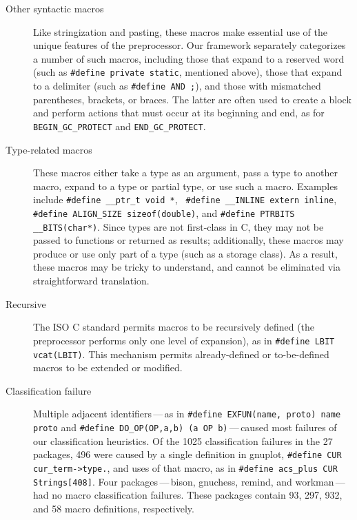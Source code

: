 \documentclass[11pt]{article}
\def\numpackages{27}
\begin{document}
\begin{description}
\item[Other syntactic macros]  Like stringization and pasting, these
  macros make essential use of the unique features of the preprocessor.
  Our framework separately categorizes a number of such macros, including
  those that expand to a reserved word (such as {\tt \#define private
  static}, mentioned above), those that expand to a delimiter (such as
{\tt \#define AND ;}), and those with mismatched parentheses, brackets, or
braces.  The latter are often used to create a block and perform actions
that must occur at its beginning and end, as for \verb|BEGIN_GC_PROTECT|
and \verb|END_GC_PROTECT|.

\item[Type-related macros]  These macros either take a type as an argument, pass
  a type to another macro, expand to a type or partial type, or use such a
  macro.  Examples include {\tt \#define \verb|__ptr_t| void *}, {\tt
  \#define \verb|__INLINE| extern inline}, {\tt \#define \verb|ALIGN_SIZE|
sizeof(double)}, and {\tt \#define PTRBITS \verb|__BITS|(char*)}.  Since
types are not first-class in C, they may not be passed to functions or
returned as results; additionally, these macros may produce or use only
part of a type (such as a storage class).  As a result, these macros may be
tricky to understand, and cannot be eliminated via straightforward
translation.

\item[Recursive]  The ISO C standard permits macros to be recursively
  defined (the preprocessor performs only one level of expansion), as in
  {\tt \#define LBIT vcat(LBIT)}.  This mechanism permits already-defined
  or to-be-defined macros to be extended or modified.

\item[Classification failure]  Multiple adjacent identifiers\,---\,as in
  {\tt \#define EXFUN(name, proto) name proto} and {\tt \#define
  \verb|DO_OP|(OP,a,b) (a OP b)}\,---\,caused most failures of our
classification heuristics.  Of the 1025 classification failures in the
{\numpackages} packages, 496 were caused by a single definition in gnuplot,
{\tt \#define CUR \verb|cur_term->type.|}, and uses of that macro, as in
{\tt \#define \verb|acs_plus| CUR Strings[408]}.  Four
packages\,---\,bison, gnuchess, remind, and workman\,---\,had no macro
classification failures.  These packages contain 93, 297, 932, and 58 macro
definitions, respectively.



\end{description}
\end{document}
